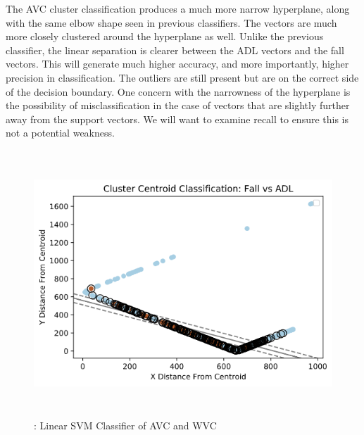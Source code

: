 \documentclass{llncs}
\begin{document}
		
	The AVC cluster classification produces a much more narrow hyperplane, along with the same elbow shape seen in previous classifiers. The vectors are much more closely clustered around the hyperplane as well. Unlike the previous classifier, the linear separation is clearer between the ADL vectors and the fall vectors. This will generate much higher accuracy, and more importantly, higher precision in classification. The outliers are still present but are on the correct side of the decision boundary. One concern with the narrowness of the hyperplane is the possibility of misclassification in the case of vectors that are slightly further away from the support vectors. We will want to examine recall to ensure this is not a potential weakness.
	
\begin{figure}
	\centering
	\includegraphics[width=12cm, height=10cm]{images/Classification/linear_classifier_boundary_avc.png} 
	\caption{: Linear SVM Classifier of AVC and WVC}
	\label{Figure 4: Linear SVM Classifier of AVC and WVC Values per Trial}
\end{figure}
        
\end{document}
